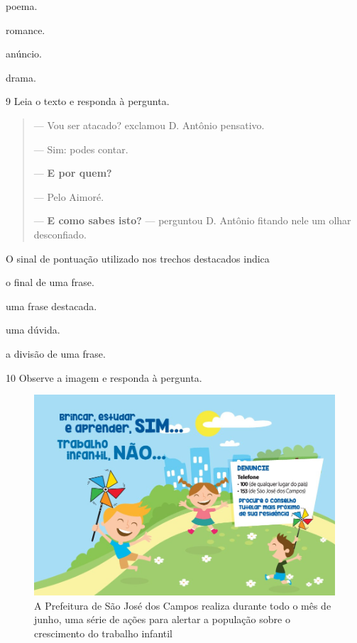 \begin{escolha}
  \item poema.

  \item romance.

  \item anúncio.

  \item drama.
\end{escolha}

\pagebreak
\num{9} Leia o texto e responda à pergunta.

\begin{quote}
--- Vou ser atacado? exclamou D. Antônio pensativo.

--- Sim: podes contar.

--- \textbf{E por quem?}

--- Pelo Aimoré.

--- \textbf{E como sabes isto?} --- perguntou D. Antônio fitando nele um olhar
desconfiado.

\end{quote}

O sinal de pontuação utilizado nos trechos destacados indica

\begin{escolha}
  \item o final de uma frase.

  \item uma frase destacada.

  \item uma dúvida.

  \item a divisão de uma frase.
\end{escolha} 


\pagebreak
\num{10} Observe a imagem e responda à pergunta.

\begin{figure}[htpb!]
\includegraphics[width=\textwidth]{./imgQ4PORT/media/image1.jpeg}
\caption{A Prefeitura de São José dos Campos realiza durante todo o mês
de junho, uma série de ações para alertar a população sobre o
crescimento do trabalho infantil}
\end{figure}

